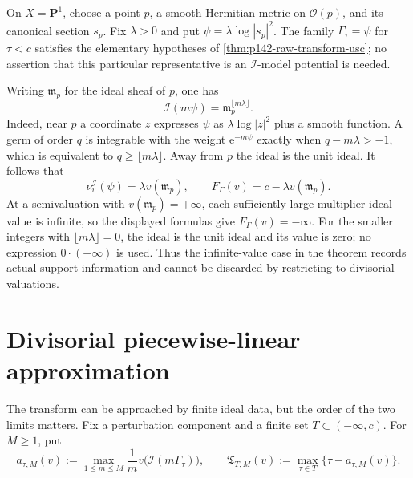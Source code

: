 \begin{example}\label{ex:p142-infinite-ideal-value}
On $X=\mathbf P^1$, choose a point $p$, a smooth Hermitian metric on
$\mathcal O(p)$, and its canonical section $s_p$. Fix $\lambda>0$ and
put $\psi=\lambda\log|s_p|^2$. The family $\Gamma_\tau=\psi$ for
$\tau<c$ satisfies the elementary hypotheses of
\cref{thm:p142-raw-transform-usc}; no assertion that this particular
representative is an $\mathcal I$-model potential is needed.

Writing $\mathfrak m_p$ for the ideal sheaf of $p$, one has
\[
       \mathcal I(m\psi)=\mathfrak m_p^{\lfloor m\lambda\rfloor}.
\]
Indeed, near $p$ a coordinate $z$ expresses $\psi$ as
$\lambda\log|z|^2$ plus a smooth function. A germ of order $q$ is
integrable with the weight $\mathrm e^{-m\psi}$ exactly when
$q-m\lambda>-1$, which is equivalent to $q\geq\lfloor m\lambda\rfloor$.
Away from $p$ the ideal is the unit ideal. It follows that
\[
 \nu_v^{\mathcal I}(\psi)=\lambda v(\mathfrak m_p),
 \qquad F_\Gamma(v)=c-\lambda v(\mathfrak m_p).
\]
At a semivaluation with $v(\mathfrak m_p)=+\infty$, each sufficiently
large multiplier-ideal value is infinite, so the displayed formulas give
$F_\Gamma(v)=-\infty$. For the smaller integers with
$\lfloor m\lambda\rfloor=0$, the ideal is the unit ideal and its value
is zero; no expression $0\cdot(+\infty)$ is used. Thus the infinite-value
case in the theorem records actual support information and cannot be
discarded by restricting to divisorial valuations.
\end{example}

\section{Divisorial piecewise-linear approximation}

The transform can be approached by finite ideal data, but the order of the
two limits matters.  Fix a perturbation component and a finite set
\(T\subset(-\infty,c)\).  For \(M\geq1\), put
\[
 a_{\tau,M}(v)
 :=\max_{1\leq m\leq M}
      \frac1m v\bigl(\mathcal I(m\Gamma_\tau)\bigr),
\qquad
 \mathfrak T_{T,M}(v)
 :=\max_{\tau\in T}\{\tau-a_{\tau,M}(v)\}.
\tag{71.36}\label{eq:pseff-finite-ideal-approximant}
\]

